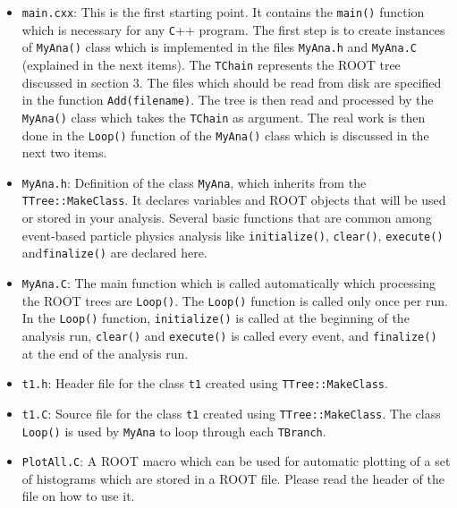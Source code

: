 \begin{itemize}
\item  \verb+main.cxx+: This is the first starting point. It contains the \verb+main()+ function which is necessary for any \verb+C+++ program. The first step is to create instances of \verb+MyAna()+ class which is implemented in the files \verb+MyAna.h+ and \verb+MyAna.C+ (explained in the next items). The \verb+TChain+ represents the ROOT tree discussed in section 3. The files which should be read from disk are specified in the function \verb+Add(filename)+. The tree is then read and processed by the \verb+MyAna()+ class which takes the \verb+TChain+ as argument. The real work is then done in the \verb+Loop()+ function of the \verb+MyAna()+ class which is discussed in the next two items. 

\item \verb+MyAna.h+: Definition of the class \verb+MyAna+, which inherits from the \verb+TTree::MakeClass+. It declares variables and ROOT objects that will be used or stored in your analysis. Several basic functions that are common among event-based particle physics analysis like \verb+initialize()+, \verb+clear()+, \verb+execute()+ and\verb+finalize()+ are declared here.
\item \verb+MyAna.C+: The main function which is called automatically which processing the ROOT trees are \verb+Loop()+. The \verb+Loop()+ function is called only once per run. In the \verb+Loop()+ function, \verb+initialize()+ is called at the beginning of the analysis run, \verb+clear()+ and \verb+execute()+ is called every event, and \verb+finalize()+ at the end of the analysis run.

\item \verb+t1.h+: Header file for the class \verb+t1+ created using \verb+TTree::MakeClass+.  

\item \verb+t1.C+: Source file for the class \verb+t1+ created using \verb+TTree::MakeClass+. The class \verb+Loop()+ is used by \verb+MyAna+ to loop through each \verb+TBranch+.

\item \verb+PlotAll.C+: A ROOT macro which can be used for automatic plotting of a set of histograms which are stored in a ROOT file. Please read the header of the file on how to use it. 
\end{itemize}
